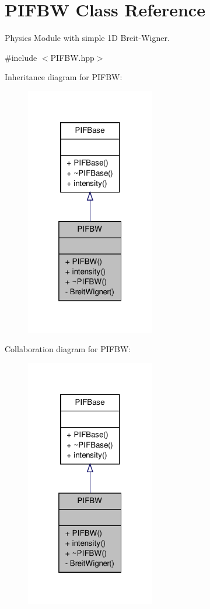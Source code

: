 \hypertarget{classPIFBW}{
\section{PIFBW Class Reference}
\label{d8/d58/classPIFBW}
}


Physics Module with simple 1D Breit-\/Wigner.  




{\ttfamily \#include $<$PIFBW.hpp$>$}



Inheritance diagram for PIFBW:
\nopagebreak
\begin{figure}[H]
\begin{center}
\leavevmode
\includegraphics[width=160pt]{dc/de4/classPIFBW__inherit__graph}
\end{center}
\end{figure}


Collaboration diagram for PIFBW:
\nopagebreak
\begin{figure}[H]
\begin{center}
\leavevmode
\includegraphics[width=160pt]{d3/d9b/classPIFBW__coll__graph}
\end{center}
\end{figure}

